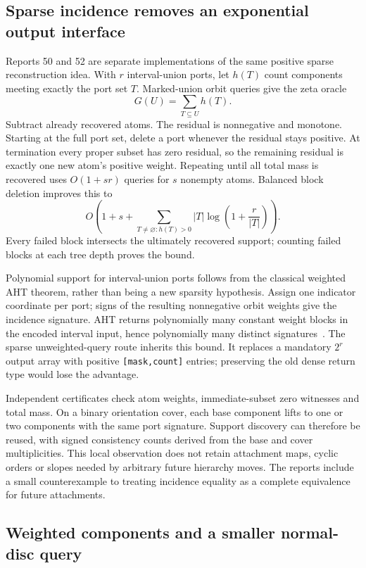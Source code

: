 \subsection{Sparse incidence removes an exponential output interface}

Reports 50 and 52 are separate implementations of the same positive sparse
reconstruction idea. With $r$ interval-union ports, let $h(T)$ count components
meeting exactly the port set $T$. Marked-union orbit queries give the zeta
oracle
\[
 G(U)=\sum_{T\subseteq U}h(T).
\]
Subtract already recovered atoms. The residual is nonnegative and monotone.
Starting at the full port set, delete a port whenever the residual stays
positive. At termination every proper subset has zero residual, so the
remaining residual is exactly one new atom's positive weight. Repeating until
all total mass is recovered uses $O(1+sr)$ queries for $s$ nonempty atoms.
Balanced block deletion improves this to
\[
 O\!\left(1+s+\sum_{T\ne\varnothing:h(T)>0}
 |T|\log\left(1+\frac r{|T|}\right)\right).
\]
Every failed block intersects the ultimately recovered support; counting
failed blocks at each tree depth proves the bound.

Polynomial support for interval-union ports follows from the classical
weighted AHT theorem, rather than being a new sparsity hypothesis. Assign
one indicator coordinate per port; signs of the resulting nonnegative orbit
weights give the incidence signature. AHT returns polynomially many constant
weight blocks in the encoded interval input, hence polynomially many distinct
signatures~\cite[Theorem 16]{aht-orbits}. The sparse unweighted-query route
inherits this bound. It replaces a mandatory $2^r$ output array with positive
\texttt{[mask,count]} entries; preserving the old dense return type would lose
the advantage.

Independent certificates check atom weights, immediate-subset zero witnesses
and total mass. On a binary orientation cover, each base component lifts to
one or two components with the same port signature. Support discovery can
therefore be reused, with signed consistency counts derived from the base
and cover multiplicities. This local observation does not retain attachment
maps, cyclic orders or slopes needed by arbitrary future hierarchy moves.
The reports include a small counterexample to treating incidence equality as
a complete equivalence for future attachments.

\subsection{Weighted components and a smaller normal-disc query}

